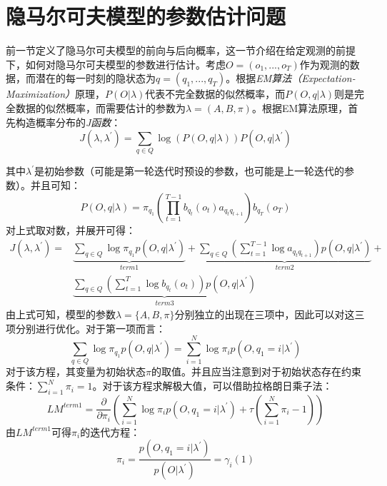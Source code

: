 \documentclass[UTF8, 12pt]{ctexart}
\begin{document}
	
\section{隐马尔可夫模型的参数估计问题}
	前一节定义了隐马尔可夫模型的前向与后向概率，这一节介绍在给定观测的前提下，如何对隐马尔可夫模型的参数进行估计。考虑$O=(o_{1},...,o_{T})$作为观测的数据，而潜在的每一时刻的隐状态为$q=(q_{1},...,q_{T})$。根据\emph{EM算法（Expectation-Maximization）}原理，$P(O|\lambda)$代表不完全数据的似然概率，而$P(O,q|\lambda)$则是完全数据的似然概率，而需要估计的参数为$\lambda=(A,B,\pi)$。根据EM算法原理，首先构造概率分布的\emph{J函数}：
	\begin{equation}
		J(\lambda, \lambda^{'})=\sum_{q \in Q} {\log(P(O,q|\lambda))P(O,q|\lambda^{'})}
	\end{equation}

	其中$\lambda^{'}$是初始参数（可能是第一轮迭代时预设的参数，也可能是上一轮迭代的参数）。并且可知：
	\begin{equation}
		P(O, q|\lambda) = \pi_{q_{1}} (\prod_{t=1}^{T-1} {b_{q_{t}}(o_{t})} {a_{q_{t}q_{t+1}}}) b_{q_{T}}(o_{T})
	\end{equation}
	对上式取对数，并展开可得：
	\begin{align}
		 J(\lambda, \lambda^{'}) = {} & \underbrace{\sum_{q \in Q} {\log\pi_{q_{1}}}p(O,q|\lambda^{'})}_{term 1}  + \underbrace{\sum_{q \in Q} ({\sum_{t=1}^{T-1}{\log a_{q_{t}q_{t+1}}}})p(O,q|\lambda^{'})}_{term 2} + \\
		 & \underbrace{\sum_{q \in Q} (\sum_{t=1}^{T}\log b_{q_{t}}(o_{t}))p(O,q|\lambda^{'})}_{term 3}
	\end{align}
	由上式可知，模型的参数$\lambda = \{A, B, \pi\}$分别独立的出现在三项中，因此可以对这三项分别进行优化。对于第一项而言：
	\begin{equation}
		\sum_{q \in Q} \log \pi_{q_{1}}p(O, q|\lambda^{'}) = \sum_{i=1}^{N} \log \pi_{i}p(O, q_{1}=i|\lambda^{'})
	\end{equation}
	对于该方程，其变量为初始状态$\pi$的取值。并且应当注意到对于初始状态存在约束条件：$\sum_{i=1}^{N} \pi_{i} =1$。对于该方程求解极大值，可以借助拉格朗日乘子法：
	\begin{equation}
		LM^{term1} = \frac{\partial}{\partial \pi_{i}}(\sum_{i=1}^{N} \log \pi_{i}p(O, q_{1}=i|\lambda^{'}) + \tau(\sum_{i=1}^{N} \pi_{i}-1)  )
	\end{equation}
	由$LM^{term1}$可得$\pi_{i}$的迭代方程：
	\begin{equation}
		\label{pi_update}
		\pi_{i} = \frac{p(O, q_{1}=i|\lambda^{'})}{p(O|\lambda^{'})} = \gamma_{i}(1)
	\end{equation}
\end{document}
